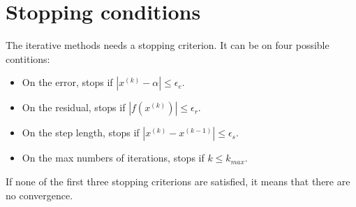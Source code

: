 \documentclass[12pt, a4paper]{report}
\newtheorem[style=M,bodystyle=\normalfont]{theorem}{Theorem}
\newtheorem[style=M,bodystyle=\normalfont]{corollary}{Corollary}
\newtheorem[style=M,bodystyle=\normalfont]{lemma}{Lemma}
\newtheorem[style=M,bodystyle=\normalfont]{definition}{Definition}
\begin{document}
    \section{Stopping conditions}
    The iterative methods needs a stopping criterion. It can be on four possible contitions: 
    \begin{itemize}
        \item On the error, stops if $\left\lvert x^{(k)}-\alpha \right\rvert \leq \epsilon_e$.
        \item On the residual, stops if $\left\lvert f\left(x^{(k)}\right) \right\rvert \leq \epsilon_r$. 
        \item On the step length, stops if $\left\lvert x^{(k)}-x^{(k-1)} \right\rvert \leq \epsilon_s$. 
        \item On the max numbers of iterations, stops if $k \leq k_{max}$. 
    \end{itemize}
    If none of the first three stopping criterions are satisfied, it means that there are no convergence. 
\end{document}
